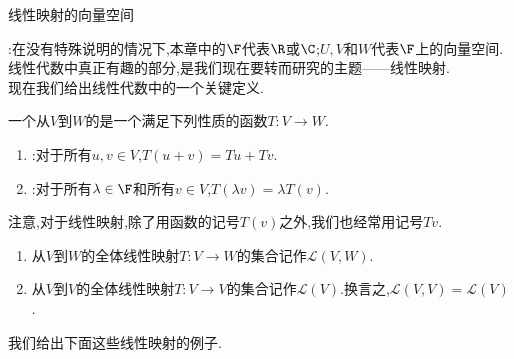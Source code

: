 \documentclass{ctexart}
\begin{document}
\pagestyle{empty}
\begin{center}\large 线性映射的向量空间\end{center}
:在没有特殊说明的情况下,本章中的$\F$代表$\R$或$\C$;$U,V$和$W$代表$\F$上的向量空间.
\\
线性代数中真正有趣的部分,是我们现在要转而研究的主题——线性映射.\\
现在我们给出线性代数中的一个关键定义.
\begin{definition}[1.1 定义:线性映射]
    一个从$V$到$W$的是一个满足下列性质的函数$T:V\to W$.
    \begin{enumerate}[label=\tbf{(\arabic*)}]
        \item {}:对于所有$u,v\in V$,$T(u+v)=Tu+Tv$.
        \item {}:对于所有$\lambda\in\F$和所有$v\in V$,$T(\lambda v)=\lambda T(v)$.
    \end{enumerate}
\end{definition}\noindent
注意,对于线性映射,除了用函数的记号$T(v)$之外,我们也经常用记号$Tv$.
\begin{definition}
    \begin{enumerate}[label=\tbf{(\alph*)}]
        \item 从$V$到$W$的全体线性映射$T:V\to W$的集合记作$\mathcal{L}(V,W)$.
        \item 从$V$到$V$的全体线性映射$T:V\to V$的集合记作$\mathcal{L}(V)$.换言之,$\mathcal{L}(V,V)=\mathcal{L}(V)$.
    \end{enumerate}
\end{definition}\noindent
我们给出下面这些线性映射的例子.
\end{document}
